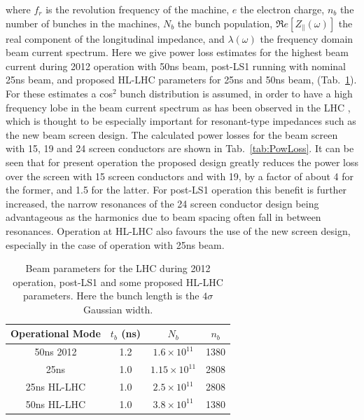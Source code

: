 \documentclass{JAC2003}
\begin{document}
where $f_{r}$ is the revolution frequency of the machine, $e$ the electron charge, $n_{b}$ the number of bunches in the machines, $N_{b}$ the bunch population, $\Re{}e[Z_{\parallel}(\omega )]$ the real component of the longitudinal impedance, and $\lambda (\omega )$ the frequency domain beam current spectrum. Here we give power loss estimates for the highest beam current during 2012 operation with 50ns beam, post-LS1 running with nominal 25ns beam, and proposed HL-LHC parameters for 25ns and 50ns beam, (Tab.~\ref{tab:BrenHLPara}). For these estimates a cos$^{2}$ bunch distribution is assumed, in order to have a high frequency lobe in the beam current spectrum as has been observed in the LHC \cite{LHCRF}, which is thought to be especially important for resonant-type impedances such as the new beam screen design. The calculated power losses for the beam screen with 15, 19 and 24 screen conductors are shown in Tab.~\ref{tab:PowLoss}. It can be seen that for present operation the proposed design greatly reduces the power loss over the screen with 15 screen conductors and with 19, by a factor of about 4 for the former, and 1.5 for the latter. For post-LS1 operation this benefit is further increased, the narrow resonances of the 24 screen conductor design being advantageous as the harmonics due to beam spacing often fall in between resonances. Operation at HL-LHC also favours the use of the new screen design, especially in the case of operation with 25ns beam.

\begin{table}
\caption{Beam parameters for the LHC during 2012 operation, post-LS1 and some proposed HL-LHC parameters. Here the bunch length is the $4\sigma$ Gaussian width.}
\label{tab:BrenHLPara}
\begin{center}
\begin{tabular}{c | c | c | c }
Operational Mode & $t_{b}$ (ns) & $N_{b}$ & $n_{b}$ \\ \hline
50ns 2012 & 1.2 & $1.6 \times 10^{11}$ & 1380 \\ \hline
25ns & 1.0 & $1.15 \times 10^{11}$ & 2808 \\ \hline
25ns HL-LHC & 1.0 &  $2.5 \times 10^{11}$ & 2808 \\ \hline
50ns HL-LHC & 1.0 &  $3.8 \times 10^{11}$ & 1380 \\ 
\end{tabular}
\end{center}
\end{table}
\end{document}
